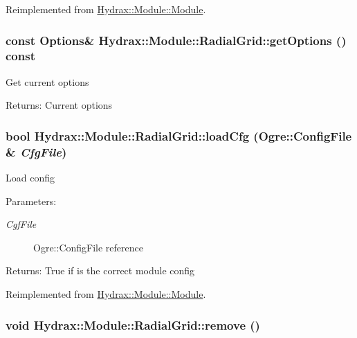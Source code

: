 Reimplemented from \hyperlink{class_hydrax_1_1_module_1_1_module_c61f89589d3b1bc7256731ddb7af7d0b}{Hydrax::Module::Module}.\hypertarget{class_hydrax_1_1_module_1_1_radial_grid_cf6dab9b665fcf36467219bcabc5aa14}{
\subsubsection[{getOptions}]{\setlength{\rightskip}{0pt plus 5cm}const {\bf Options}\& Hydrax::Module::RadialGrid::getOptions () const}}
\label{class_hydrax_1_1_module_1_1_radial_grid_cf6dab9b665fcf36467219bcabc5aa14}


Get current options \begin{Desc}
\item[Returns:]Current options \end{Desc}
\hypertarget{class_hydrax_1_1_module_1_1_radial_grid_31b3bab8e74f2f1e316a1800470ac685}{
\subsubsection[{loadCfg}]{\setlength{\rightskip}{0pt plus 5cm}bool Hydrax::Module::RadialGrid::loadCfg (Ogre::ConfigFile \& {\em CfgFile})}}
\label{class_hydrax_1_1_module_1_1_radial_grid_31b3bab8e74f2f1e316a1800470ac685}


Load config \begin{Desc}
\item[Parameters:]
\begin{description}
\item[{\em CgfFile}]Ogre::ConfigFile reference \end{description}
\end{Desc}
\begin{Desc}
\item[Returns:]True if is the correct module config \end{Desc}


Reimplemented from \hyperlink{class_hydrax_1_1_module_1_1_module_bedb96357608c0744bb7816ae1c2b0bb}{Hydrax::Module::Module}.\hypertarget{class_hydrax_1_1_module_1_1_radial_grid_5b595aede4b235740be75fb5cf1072cf}{
\subsubsection[{remove}]{\setlength{\rightskip}{0pt plus 5cm}void Hydrax::Module::RadialGrid::remove ()}}
\label{class_hydrax_1_1_module_1_1_radial_grid_5b595aede4b235740be75fb5cf1072cf}


